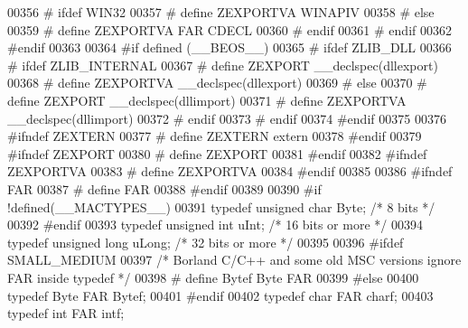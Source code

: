 \begin{DoxyCode}
00356 \textcolor{preprocessor}{#    ifdef WIN32}
00357 \textcolor{preprocessor}{#      define ZEXPORTVA WINAPIV}
00358 \textcolor{preprocessor}{#    else}
00359 \textcolor{preprocessor}{#      define ZEXPORTVA FAR CDECL}
00360 \textcolor{preprocessor}{#    endif}
00361 \textcolor{preprocessor}{#  endif}
00362 \textcolor{preprocessor}{#endif}
00363 
00364 \textcolor{preprocessor}{#if defined (\_\_BEOS\_\_)}
00365 \textcolor{preprocessor}{#  ifdef ZLIB\_DLL}
00366 \textcolor{preprocessor}{#    ifdef ZLIB\_INTERNAL}
00367 \textcolor{preprocessor}{#      define ZEXPORT   \_\_declspec(dllexport)}
00368 \textcolor{preprocessor}{#      define ZEXPORTVA \_\_declspec(dllexport)}
00369 \textcolor{preprocessor}{#    else}
00370 \textcolor{preprocessor}{#      define ZEXPORT   \_\_declspec(dllimport)}
00371 \textcolor{preprocessor}{#      define ZEXPORTVA \_\_declspec(dllimport)}
00372 \textcolor{preprocessor}{#    endif}
00373 \textcolor{preprocessor}{#  endif}
00374 \textcolor{preprocessor}{#endif}
00375 
00376 \textcolor{preprocessor}{#ifndef ZEXTERN}
00377 \textcolor{preprocessor}{#  define ZEXTERN extern}
00378 \textcolor{preprocessor}{#endif}
00379 \textcolor{preprocessor}{#ifndef ZEXPORT}
00380 \textcolor{preprocessor}{#  define ZEXPORT}
00381 \textcolor{preprocessor}{#endif}
00382 \textcolor{preprocessor}{#ifndef ZEXPORTVA}
00383 \textcolor{preprocessor}{#  define ZEXPORTVA}
00384 \textcolor{preprocessor}{#endif}
00385 
00386 \textcolor{preprocessor}{#ifndef FAR}
00387 \textcolor{preprocessor}{#  define FAR}
00388 \textcolor{preprocessor}{#endif}
00389 
00390 \textcolor{preprocessor}{#if !defined(\_\_MACTYPES\_\_)}
00391 \textcolor{keyword}{typedef} \textcolor{keywordtype}{unsigned} \textcolor{keywordtype}{char}  Byte;  \textcolor{comment}{/* 8 bits */}
00392 \textcolor{preprocessor}{#endif}
00393 \textcolor{keyword}{typedef} \textcolor{keywordtype}{unsigned} \textcolor{keywordtype}{int}   uInt;  \textcolor{comment}{/* 16 bits or more */}
00394 \textcolor{keyword}{typedef} \textcolor{keywordtype}{unsigned} \textcolor{keywordtype}{long}  uLong; \textcolor{comment}{/* 32 bits or more */}
00395 
00396 \textcolor{preprocessor}{#ifdef SMALL\_MEDIUM}
00397    \textcolor{comment}{/* Borland C/C++ and some old MSC versions ignore FAR inside typedef */}
00398 \textcolor{preprocessor}{#  define Bytef Byte FAR}
00399 \textcolor{preprocessor}{#else}
00400    \textcolor{keyword}{typedef} Byte  FAR Bytef;
00401 \textcolor{preprocessor}{#endif}
00402 \textcolor{keyword}{typedef} \textcolor{keywordtype}{char}  FAR charf;
00403 \textcolor{keyword}{typedef} \textcolor{keywordtype}{int}   FAR intf;

\end{DoxyCode}
